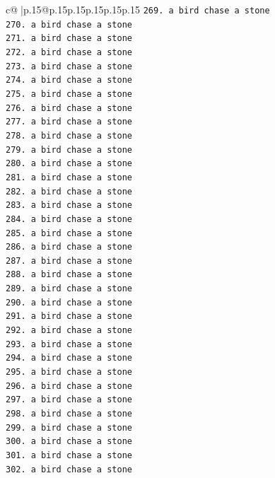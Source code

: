 \documentclass{article}
\begin{document}
{\begin{supertabular}{c@{$\;$}|p{.15\linewidth}@{}p{.15\linewidth}p{.15\linewidth}p{.15\linewidth}p{.15\linewidth}p{.15\linewidth}}
{{{\texttt{269. a bird chase a stone} \\
\texttt{270. a bird chase a stone} \\
\texttt{271. a bird chase a stone} \\
\texttt{272. a bird chase a stone} \\
\texttt{273. a bird chase a stone} \\
\texttt{274. a bird chase a stone} \\
\texttt{275. a bird chase a stone} \\
\texttt{276. a bird chase a stone} \\
\texttt{277. a bird chase a stone} \\
\texttt{278. a bird chase a stone} \\
\texttt{279. a bird chase a stone} \\
\texttt{280. a bird chase a stone} \\
\texttt{281. a bird chase a stone} \\
\texttt{282. a bird chase a stone} \\
\texttt{283. a bird chase a stone} \\
\texttt{284. a bird chase a stone} \\
\texttt{285. a bird chase a stone} \\
\texttt{286. a bird chase a stone} \\
\texttt{287. a bird chase a stone} \\
\texttt{288. a bird chase a stone} \\
\texttt{289. a bird chase a stone} \\
\texttt{290. a bird chase a stone} \\
\texttt{291. a bird chase a stone} \\
\texttt{292. a bird chase a stone} \\
\texttt{293. a bird chase a stone} \\
\texttt{294. a bird chase a stone} \\
\texttt{295. a bird chase a stone} \\
\texttt{296. a bird chase a stone} \\
\texttt{297. a bird chase a stone} \\
\texttt{298. a bird chase a stone} \\
\texttt{299. a bird chase a stone} \\
\texttt{300. a bird chase a stone} \\
\texttt{301. a bird chase a stone} \\
\texttt{302. a bird chase a stone} \\
}}}
\end{supertabular}}
\end{document}
